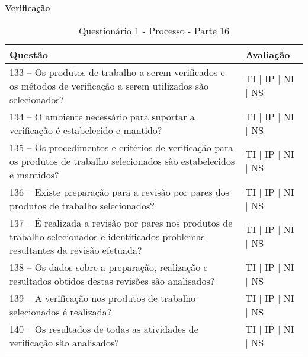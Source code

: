 \documentclass[openany,10pt,a4paper]{article}
\begin{document}
\begin{appendix}
\begin{table}[h]
\textbf{Verificação }
	\centering
	\caption{Questionário 1 - Processo - Parte 16}
	\begin{tabular}{p{3.5in}p{2in}}		
		\toprule
		\textbf{Questão}  & \textbf{Avaliação}\\ 
		\midrule
		133 – Os produtos de trabalho a serem verificados e os métodos de verificação a serem 
utilizados são selecionados?
 & TI | IP | NI | NS \\
        \midrule
		134 – O ambiente necessário para suportar a verificação é estabelecido e mantido?
 & TI | IP | NI | NS \\
		\midrule
		135 – Os procedimentos e critérios de verificação para os produtos de trabalho selecionados são 
estabelecidos e mantidos?
 & TI | IP | NI | NS \\
		\midrule
        136 – Existe preparação para a revisão por pares dos produtos de trabalho selecionados?
 & TI | IP | NI | NS \\
		\midrule
		137 – É realizada a revisão por pares nos produtos de trabalho selecionados e identificados 
problemas resultantes da revisão efetuada?
  & TI | IP | NI | NS \\
		\midrule
		138 – Os dados sobre a preparação, realização e resultados obtidos destas revisões são 
analisados?
 & TI | IP | NI | NS \\
 \midrule
		139 – A verificação nos produtos de trabalho selecionados é realizada?
 & TI | IP | NI | NS \\
  \midrule
		140 – Os resultados de todas as atividades de verificação são analisados? 
 & TI | IP | NI | NS \\
		\bottomrule
	\end{tabular} 
	\label{tab:tabela1}
\end{table}



\end{appendix}
\end{document}
